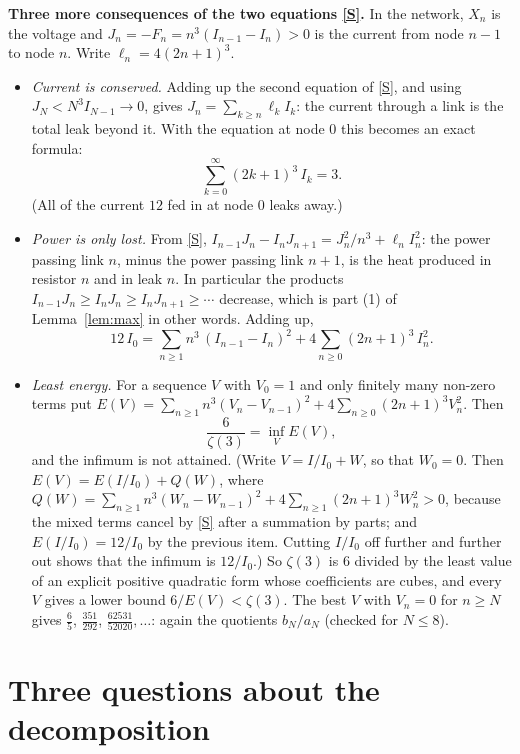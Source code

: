 \documentclass[11pt]{article}
\newcommand{\q}[1]{\medskip\noindent\textbf{#1}}
\begin{document}
\q{Three more consequences of the two equations \eqref{S}.} In the network, $X_n$ is the voltage
and $J_n=-F_n=n^3(I_{n-1}-I_n)>0$ is the current from node $n-1$ to node $n$. Write
$\ell_n=4(2n+1)^3$.
\begin{itemize}
\item \emph{Current is conserved.} Adding up the second equation of \eqref{S}, and using
$J_N<N^3I_{N-1}\to0$, gives $J_n=\sum_{k\ge n}\ell_kI_k$: the current through a link is the total
leak beyond it. With the equation at node $0$ this becomes an exact formula:
\[
\sum_{k=0}^\infty(2k+1)^3\,I_k=3 .
\]
(All of the current $12$ fed in at node $0$ leaks away.)
\item \emph{Power is only lost.} From \eqref{S}, $I_{n-1}J_n-I_nJ_{n+1}=J_n^2/n^3+\ell_nI_n^2$: the
power passing link $n$, minus the power passing link $n+1$, is the heat produced in resistor $n$
and in leak $n$. In particular the products $I_{n-1}J_n\ge I_nJ_n\ge I_nJ_{n+1}\ge\cdots$ decrease,
which is part (1) of Lemma~\ref{lem:max} in other words. Adding up,
\[
12\,I_0=\sum_{n\ge1}n^3\,(I_{n-1}-I_n)^2+4\sum_{n\ge0}(2n+1)^3\,I_n^2 .
\]
\item \emph{Least energy.} For a sequence $V$ with $V_0=1$ and only finitely many non-zero terms
put $E(V)=\sum_{n\ge1}n^3(V_n-V_{n-1})^2+4\sum_{n\ge0}(2n+1)^3V_n^2$. Then
\[
\frac6{\zeta(3)}=\inf_VE(V),
\]
and the infimum is not attained. (Write $V=I/I_0+W$, so that $W_0=0$. Then $E(V)=E(I/I_0)+Q(W)$, where
$Q(W)=\sum_{n\ge1}n^3(W_n-W_{n-1})^2+4\sum_{n\ge1}(2n+1)^3W_n^2>0$, because the mixed terms cancel by
\eqref{S} after a summation by parts; and $E(I/I_0)=12/I_0$ by the previous item. Cutting $I/I_0$
off further and further out shows that the infimum is $12/I_0$.) So $\zeta(3)$ is $6$ divided by the least value of an
explicit positive quadratic form whose coefficients are cubes, and every $V$ gives a lower bound
$6/E(V)<\zeta(3)$. The best $V$ with $V_n=0$ for $n\ge N$ gives $\frac65$, $\frac{351}{292}$,
$\frac{62531}{52020},\dots$: again the quotients $b_N/a_N$ (checked for $N\le8$).
\end{itemize}

\section{Three questions about the decomposition}
\end{document}
